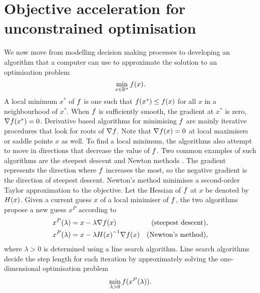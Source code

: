 \documentclass[main.tex]{subfiles}
\begin{document}
\chapter{Objective acceleration for unconstrained optimisation}\label{ch:objaccel}

We now move from modelling decision making processes
to developing an algorithm that a computer
can use to approximate the solution to an optimisation problem
\begin{equation}
  \min_{x\in\mathbb{R}^n} f(x).
\end{equation}
A local minimum $x^*$ of $f$ is one such that
$f(x^*)\leq f(x)$ for all $x$ in a neighbourhood of $x^*$.  When
$f$ is sufficiently smooth, the gradient at $x^*$ is zero,
$\nabla f(x^*)=0$.  Derivative based algorithms for minimising
$f$ are mainly iterative procedures that look for roots of
$\nabla f$.  Note that $\nabla f(x)=0$ at local maximisers or
saddle points $x$ as well. To find a local minimum, the algorithms also
attempt to move in directions that decrease the value of
$f$.  Two common examples of such algorithms are the steepest
descent and Newton methods \citep{nocedal2006numerical}.  The gradient
represents the direction where $f$ increases the most, so the
negative gradient is the direction of steepest descent. Newton's
method minimises a second-order Taylor approximation to the objective.
Let the Hessian of $f$ at $x$ be denoted by $H(x)$.  Given a
current guess $x$ of a local minimiser of $f$, the two algorithms
propose a new guess $x^P$ according to
\begin{align}\label{eq:steepest_descent_step}
  x^P(\lambda)
  &= x - \lambda \nabla f(x)
  &\textnormal{(steepest descent)}&,\\
  x^P(\lambda)
  &= x-\lambda {H(x)}^{-1}\nabla f(x)
  &\textnormal{(Newton's method)}&,\label{eq:newton_step}
\end{align}
where $\lambda>0$ is determined using a line search algorithm.
Line search algorithms decide the step length for each iteration by
approximately solving the one-dimensional optimisation problem
\begin{equation}
  \min_{\lambda>0} f(x^P(\lambda)).
\end{equation}
\end{document}
